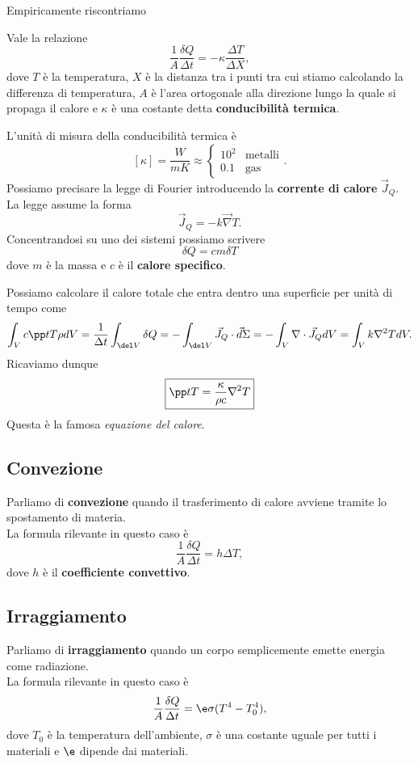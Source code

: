 \noindent Empiricamente riscontriamo
\begin{fact}
Vale la relazione
\[\frac1A\frac{\delta Q}{\Delta t}=-\kappa\frac{\Delta T}{\Delta X},\]
dove $T$ \`e la temperatura, $X$ \`e la distanza tra i punti tra cui stiamo calcolando la differenza di temperatura, $A$ \`e l'area ortogonale alla direzione lungo la quale si propaga il calore e $\kappa$ \`e una costante detta \textbf{conducibilit\`a termica}.
\end{fact}

\noindent L'unit\`a di misura della conducibilit\`a termica \`e
\[[\kappa]=\frac W{mK}\approx \begin{cases}
10^2 &\text{metalli}\\
0.1 &\text{gas}
\end{cases}.\]
\noindent Possiamo precisare la legge di Fourier introducendo la
\textbf{corrente di calore} $\vec J_Q$. La legge assume la forma
\[\vec J_Q=-k\vec \nabla T.\]
Concentrandosi su uno dei sistemi possiamo scrivere
\[\boxed{\delta Q= cm\delta T}\]
dove $m$ \`e la massa e $c$ \`e il \textbf{calore specifico}.\bigskip

\noindent Possiamo calcolare il calore totale che entra dentro una superficie per unit\`a di tempo come
\[\int_V c\pp tT\rho dV=\frac1{\Delta t}\int_{\del V} \delta Q=-\int_{\del V} \vec J_Q\cdot \vec d\Sigma=-\int_V \nabla \cdot \vec J_Q dV=\int_Vk\nabla^2 T dV.\]
Ricaviamo dunque
\[\boxed{\pp tT=\frac{\kappa}{\rho c}\nabla^2T}\]
Questa \`e la famosa \textit{equazione del calore}.

\subsection{Convezione}
Parliamo di \textbf{convezione} quando il trasferimento di calore avviene tramite lo spostamento di materia.\\ La formula rilevante in questo caso \`e
\[\frac1A\frac{\delta Q}{\Delta t}=h\Delta T,\]
dove $h$ \`e il \textbf{coefficiente convettivo}.

\subsection{Irraggiamento}
Parliamo di \textbf{irraggiamento} quando un corpo semplicemente emette energia come radiazione.\\ 
La formula rilevante in questo caso \`e
\[\frac1A\frac{\delta Q}{\Delta t}=\e \sigma(T^4-T_0^4),\]
dove $T_0$ \`e la temperatura dell'ambiente, $\sigma$ \`e una costante uguale per tutti i materiali e $\e$ dipende dai materiali.

